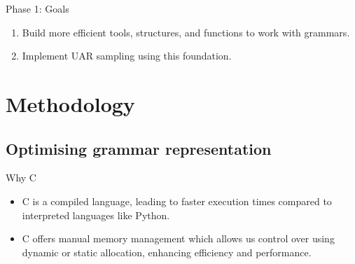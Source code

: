 \documentclass{beamer}
\begin{document}
	\begin{frame}{Phase 1: Goals}
		\begin{enumerate}
			\item Build more efficient tools, structures, and functions to work with grammars.
			\item Implement UAR sampling using this foundation.
		\end{enumerate}



		
	\end{frame}

	\section{Methodology}

	\subsection{Optimising grammar representation}

\begin{frame}{Why C}
			
	\begin{itemize}
		\item C is a compiled language, leading to \alert{faster execution times} compared to interpreted languages like Python.
		\item C offers \alert{manual memory management} which allows us control over using dynamic or static allocation, enhancing efficiency and performance. 
	\end{itemize}

\end{frame}
\end{document}
